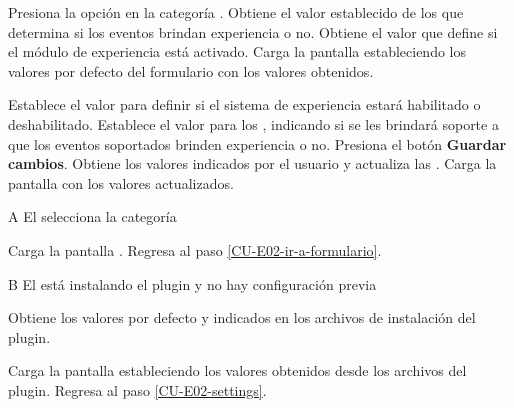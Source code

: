 \begin{UCtrayectoria}%
%
   

  \Actor Presiona la opción {\bf {}} en la categoría
         .  \label{CU-E02-ir-a-formulario}
  \Sistema Obtiene el valor establecido de los  que determina si los eventos brindan
           experiencia o no. \label{CU-E03-formulario} 
  \Sistema Obtiene el valor  que define si el
           módulo de experiencia está activado.
  \Sistema Carga la pantalla  estableciendo los valores por defecto del
           formulario con los valores obtenidos.

  \Actor Establece el valor  para definir si
         el sistema de experiencia estará habilitado o deshabilitado.
         \label{CU-E02-settings}
  \Actor Establece el valor para los , indicando si se les brindará soporte a que
         los eventos soportados brinden experiencia o no.
  \Actor Presiona el botón {\bf Guardar cambios}.
  \Sistema Obtiene los valores indicados por el usuario y actualiza las
           .
  \Sistema Carga la pantalla  con los valores actualizados.

\end{UCtrayectoria}

\begin{UCtrayectoriaA}{A}{%
El  selecciona la categoría }

    \Sistema Carga la pantalla .
    \Sistema Regresa al paso \ref{CU-E02-ir-a-formulario}.
\end{UCtrayectoriaA}

\begin{UCtrayectoriaA}{B}{%
El  está instalando el plugin y no hay configuración previa }

  \Sistema Obtiene los valores por defecto  y
            indicados en los archivos de instalación del
           plugin.

  \Sistema Carga la pantalla  estableciendo los valores obtenidos desde los
           archivos del plugin.
  \Sistema Regresa al paso \ref{CU-E02-settings}.
\end{UCtrayectoriaA}

